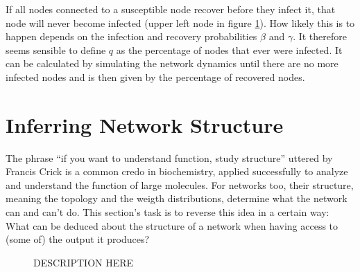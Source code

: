 \documentclass{scrartcl}
\begin{document}
If all nodes connected to a susceptible node recover before they infect it, that node will never become infected (upper left node in figure \ref{}). How likely this is to happen depends on the infection and recovery probabilities $\beta$ and $\gamma$. 
It therefore seems sensible to define $q$ as the percentage of nodes that ever were infected. 
It can be calculated by simulating the network dynamics until there are no more infected nodes and is then given by the percentage of recovered nodes. 




\clearpage
\section{Inferring Network Structure}
The phrase \enquote{if you want to understand function, study structure}
uttered by Francis Crick is a common credo in biochemistry, applied
successfully to analyze and understand the function of large molecules. For
networks too, their structure, meaning the topology and the weigth
distributions, determine what the network can and can't do. This section's
task is to reverse this idea in a certain way: What can be deduced about
the structure of a network when having access to (some of) the output it
produces?



\begin{figure}
    \centering
    \def\svgwidth{0.9\textwidth}
    
    \caption{DESCRIPTION HERE}
    \label{fig:D41}
\end{figure}
\end{document}
